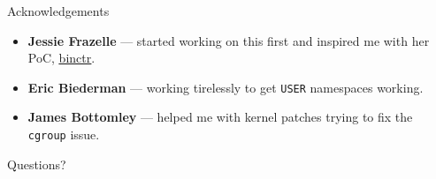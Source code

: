 \documentclass[10pt,aspectratio=169]{beamer}
\begin{document}
	\begin{frame}{Acknowledgements}
		\begin{itemize}
			\item \textbf{Jessie Frazelle} --- started working on this first and inspired me with her PoC, \href{https://github.com/jessfraz/binctr}{\underline{binctr}}.
			\item \textbf{Eric Biederman}  --- working tirelessly to get \texttt{USER} namespaces working.
			\item \textbf{James Bottomley} --- helped me with kernel patches trying to fix the \texttt{cgroup} issue.
		\end{itemize}
	\end{frame}

	\begin{frame}
		\begin{center}
			\Huge Questions?
		\end{center}
	\end{frame}
\end{document}

